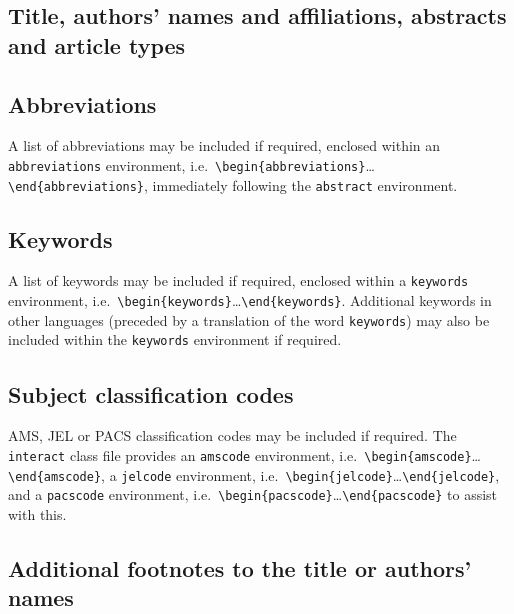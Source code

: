 \documentclass[]{interact}
\theoremstyle{plain}%
\theoremstyle{definition}
\theoremstyle{remark}
\begin{document}
\hypertarget{title-authors-names-and-affiliations-abstracts-and-article-types}{%
\subsection{Title, authors' names and affiliations, abstracts and
article
types}\label{title-authors-names-and-affiliations-abstracts-and-article-types}}

\hypertarget{abbreviations}{%
\subsection{Abbreviations}\label{abbreviations}}

A list of abbreviations may be included if required, enclosed within an
\texttt{abbreviations} environment,
i.e.~\texttt{\textbackslash{}begin\{abbreviations\}}\ldots\texttt{\textbackslash{}end\{abbreviations\}},
immediately following the \texttt{abstract} environment.

\hypertarget{keywords}{%
\subsection{Keywords}\label{keywords}}

A list of keywords may be included if required, enclosed within a
\texttt{keywords} environment,
i.e.~\texttt{\textbackslash{}begin\{keywords\}}\ldots\texttt{\textbackslash{}end\{keywords\}}.
Additional keywords in other languages (preceded by a translation of the
word \texttt{keywords}) may also be included within the
\texttt{keywords} environment if required.

\hypertarget{subject-classification-codes}{%
\subsection{Subject classification
codes}\label{subject-classification-codes}}

AMS, JEL or PACS classification codes may be included if required. The
\texttt{interact} class file provides an \texttt{amscode} environment,
i.e.~\texttt{\textbackslash{}begin\{amscode\}}\ldots\texttt{\textbackslash{}end\{amscode\}},
a \texttt{jelcode} environment,
i.e.~\texttt{\textbackslash{}begin\{jelcode\}}\ldots\texttt{\textbackslash{}end\{jelcode\}},
and a \texttt{pacscode} environment,
i.e.~\texttt{\textbackslash{}begin\{pacscode\}}\ldots\texttt{\textbackslash{}end\{pacscode\}}
to assist with this.

\hypertarget{additional-footnotes-to-the-title-or-authors-names}{%
\subsection{Additional footnotes to the title or authors'
names}\label{additional-footnotes-to-the-title-or-authors-names}}
\end{document}
